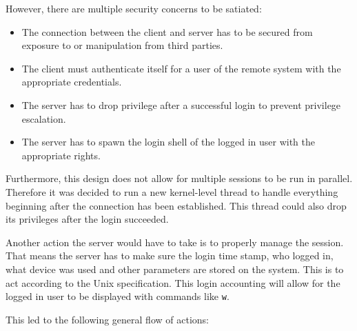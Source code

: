 \documentclass[10pt,a4paper,titlepage,twoside,english,final]{zhawreprt}
\begin{document}
However, there are multiple security concerns to be satiated:

\begin{itemize}
\item The connection between the client and server has to be secured from exposure to or manipulation from third parties.
\item The client must authenticate itself for a user of the remote system with the appropriate credentials.
\item The server has to drop privilege after a successful \gls{login} to prevent privilege escalation.
\item The server has to spawn the \gls{login} \gls{shell} of the logged in user with the appropriate rights.
\end{itemize}

Furthermore, this design does not allow for multiple sessions to be run in parallel.
Therefore it was decided to run a new kernel-level thread to handle everything beginning after the connection has been established.
This thread could also drop its privileges after the \gls{login} succeeded.

Another action the server would have to take is to properly manage the session.
That means the server has to make sure the \gls{login} time stamp, who logged in, what device was used and other parameters are stored on the system.
This is to act according to the \gls{Unix} specification.
This \gls{login} accounting will allow for the logged in user to be displayed with commands like \texttt{w}.

This led to  the following general flow of actions:
\end{document}
